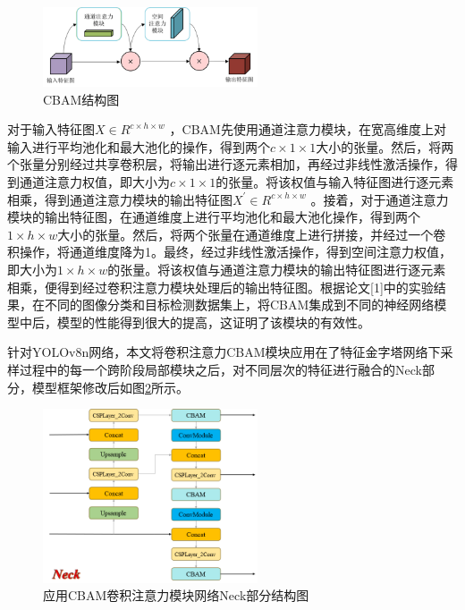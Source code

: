 \documentclass[journal]{IEEEtran}
\numberwithin{figure}{section}%
\begin{document}
\begin{figure}
  \centering
  \includegraphics[width=2.5in]{./figures/4_1.png}
  \caption{CBAM结构图}
  \label{fig:CBAM}
\end{figure}

对于输入特征图$X\in R^{c\times h\times w}$ ，CBAM先使用通道注意力模块，在宽高维度上对输入进行平均池化和最大池化的操作，得到两个$c\times1\times1$大小的张量。然后，将两个张量分别经过共享卷积层，将输出进行逐元素相加，再经过非线性激活操作，得到通道注意力权值，即大小为$c\times1\times1$的张量。将该权值与输入特征图进行逐元素相乘，得到通道注意力模块的输出特征图$X^{\prime}\in R^{c\times h\times w}$ 。接着，对于通道注意力模块的输出特征图，在通道维度上进行平均池化和最大池化操作，得到两个$1\times h\times w$大小的张量。然后，将两个张量在通道维度上进行拼接，并经过一个卷积操作，将通道维度降为1。最终，经过非线性激活操作，得到空间注意力权值，即大小为$1\times h\times w$的张量。将该权值与通道注意力模块的输出特征图进行逐元素相乘，便得到经过卷积注意力模块处理后的输出特征图。根据论文[1]中的实验结果，在不同的图像分类和目标检测数据集上，将CBAM集成到不同的神经网络模型中后，模型的性能得到很大的提高，这证明了该模块的有效性。\par

针对YOLOv8n网络，本文将卷积注意力CBAM模块应用在了特征金字塔网络下采样过程中的每一个跨阶段局部模块之后，对不同层次的特征进行融合的Neck部分，模型框架修改后如图\ref{fig:Neck}所示。\par

\begin{figure}
  \centering
  \includegraphics[width=2.5in]{./figures/4_2.png}
  \caption{应用CBAM卷积注意力模块网络Neck部分结构图}
  \label{fig:Neck}
\end{figure}
\end{document}
